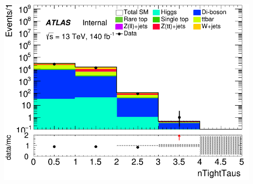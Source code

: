 \documentclass[usenames,dvipsnames]{beamer}
\begin{document}
\begin{frame}
\begin{minipage}{0.32\textwidth}
        \includegraphics[width=\textwidth]{graphics/L_met/L_met_nTightTaus.png}
    \end{minipage}
\end{frame}
\end{document}
